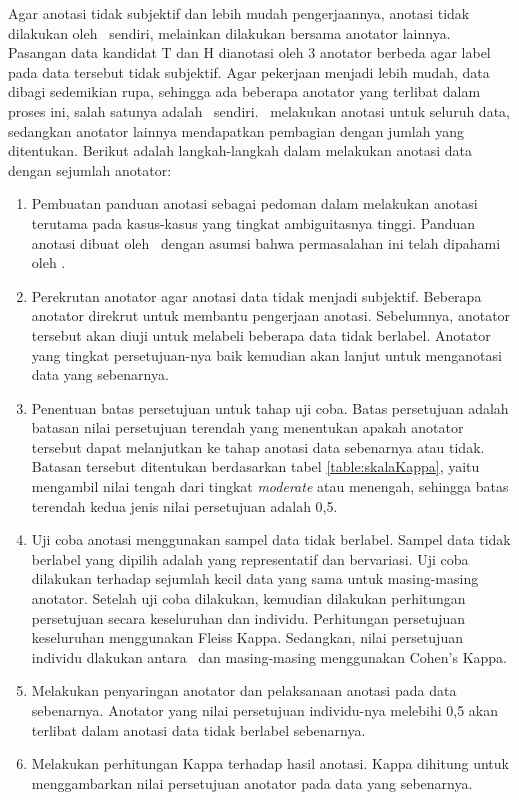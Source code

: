 Agar anotasi tidak subjektif dan lebih mudah pengerjaannya, anotasi tidak dilakukan oleh \saya~sendiri, melainkan dilakukan bersama anotator lainnya. Pasangan data kandidat T dan H dianotasi oleh 3 anotator berbeda agar label pada data tersebut tidak subjektif. Agar pekerjaan menjadi lebih mudah, data dibagi sedemikian rupa, sehingga ada beberapa anotator yang terlibat dalam proses ini, salah satunya adalah \saya~sendiri. \Saya~melakukan anotasi untuk seluruh data, sedangkan anotator lainnya mendapatkan pembagian dengan jumlah yang ditentukan. Berikut adalah langkah-langkah dalam melakukan anotasi data dengan sejumlah anotator:
\begin{enumerate}
	\item Pembuatan panduan anotasi sebagai pedoman dalam melakukan anotasi terutama pada kasus-kasus yang tingkat ambiguitasnya tinggi. Panduan anotasi dibuat oleh \saya~dengan asumsi bahwa permasalahan ini telah dipahami oleh \saya.
	\item Perekrutan anotator agar anotasi data tidak menjadi subjektif. Beberapa anotator direkrut untuk membantu pengerjaan anotasi. Sebelumnya, anotator tersebut akan diuji untuk melabeli beberapa data tidak berlabel. Anotator yang tingkat persetujuan-nya baik kemudian akan lanjut untuk menganotasi data yang sebenarnya.
	\item Penentuan batas persetujuan untuk tahap uji coba.	Batas persetujuan adalah batasan nilai persetujuan terendah yang menentukan apakah anotator tersebut dapat melanjutkan ke tahap anotasi data sebenarnya atau tidak. Batasan tersebut ditentukan berdasarkan tabel \ref{table:skalaKappa}, yaitu mengambil nilai tengah dari tingkat \textit{moderate} atau menengah, sehingga batas terendah kedua jenis nilai persetujuan adalah 0,5.
	\item Uji coba anotasi menggunakan sampel data tidak berlabel. Sampel data tidak berlabel yang dipilih adalah yang representatif dan bervariasi. Uji coba dilakukan terhadap sejumlah kecil data yang sama untuk masing-masing anotator. Setelah uji coba dilakukan, kemudian dilakukan perhitungan persetujuan secara keseluruhan dan individu. Perhitungan persetujuan keseluruhan menggunakan Fleiss Kappa. Sedangkan, nilai persetujuan individu dlakukan antara \saya~dan masing-masing menggunakan Cohen's Kappa. 
	\item Melakukan penyaringan anotator dan pelaksanaan anotasi pada data sebenarnya. Anotator yang nilai persetujuan individu-nya melebihi 0,5 akan terlibat dalam anotasi data tidak berlabel sebenarnya. 
	\item Melakukan perhitungan Kappa terhadap hasil anotasi. Kappa dihitung untuk menggambarkan nilai persetujuan anotator pada data yang sebenarnya.
		
\end{enumerate}

